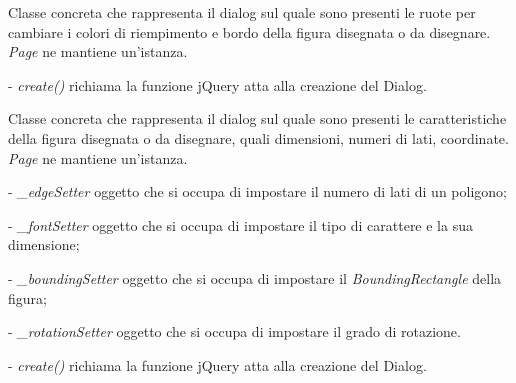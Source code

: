 Classe concreta che rappresenta il dialog sul quale sono presenti le ruote per cambiare i colori di riempimento e bordo della figura disegnata o da disegnare.
\textit{Page} ne mantiene un'istanza.

\begin{elencopuntato}[\subsubsecindent]
\item[-] \textit{create()} richiama la funzione jQuery atta alla creazione del Dialog.
\end{elencopuntato}

Classe concreta che rappresenta il dialog sul quale sono presenti le caratteristiche della figura disegnata o da disegnare, quali dimensioni, numeri di lati, coordinate.
\textit{Page} ne mantiene un'istanza.
\begin{elencopuntato}[\subsubsecindent]
\item[-] \textit{{\_}edgeSetter} oggetto che si occupa di impostare il numero di lati di un poligono;
\item[-] \textit{{\_}fontSetter} oggetto che si occupa di impostare il tipo di carattere e la sua dimensione;
\item[-] \textit{{\_}boundingSetter} oggetto che si occupa di impostare il \textit{BoundingRectangle} della figura;
\item[-] \textit{{\_}rotationSetter} oggetto che si occupa di impostare il grado di rotazione.
\end{elencopuntato}
\begin{elencopuntato}[\subsubsecindent]
\item[-] \textit{create()} richiama la funzione jQuery atta alla creazione del Dialog.
\end{elencopuntato}

